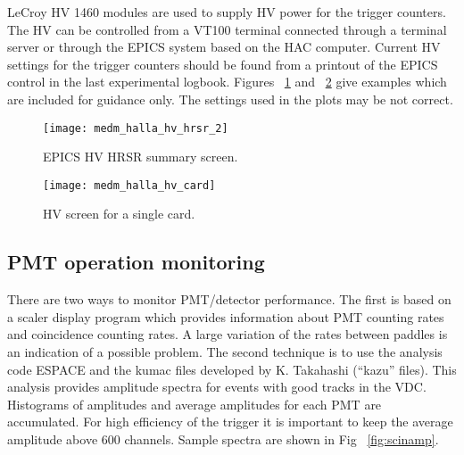 LeCroy HV 1460 modules are used to supply HV power for the
trigger counters. The HV can be controlled from 
a VT100 terminal connected through a terminal server or through
the EPICS system based on the HAC computer. 
Current HV settings for the trigger counters should be found from
a printout of the EPICS control in the 
last experimental logbook.   
Figures ~\ref{fig:scinhv} and ~\ref{fig:s1scinhvc} give examples
which are included for guidance only. The settings used in the
plots may be not correct.

\begin{figure}[p]
\begin{center}
\texttt{[image: medm\_halla\_hv\_hrsr\_2]}
{\linespread{1.}
\caption[Detectors: HV HRSR Summary Screen]{EPICS HV HRSR summary screen.}
\label{fig:scinhv}}
\end{center}
\end{figure}

\begin{figure}[p]
\begin{center}
\texttt{[image: medm\_halla\_hv\_card]}
{\linespread{1.}
\caption[Detectors: HV Screen for Single Card]{HV screen for a
single card.}
\label{fig:s1scinhvc}}
\end{center}
\end{figure}

\subsection{PMT operation monitoring}

There are two ways to monitor PMT/detector performance. The first
is based on a scaler display program which provides information
about PMT counting rates and coincidence counting rates.
A large variation of the rates between paddles
is an indication of a possible problem.
The second technique is to use the analysis code ESPACE and the
kumac files developed by K. Takahashi 
(``kazu'' files). This analysis provides amplitude spectra for
events with good tracks in the VDC.
Histograms of amplitudes and average amplitudes for each PMT are
accumulated. For high efficiency
of the trigger it is important to keep the average amplitude
above 600 channels. Sample spectra are shown in Fig ~\ref{fig:scinamp}.

